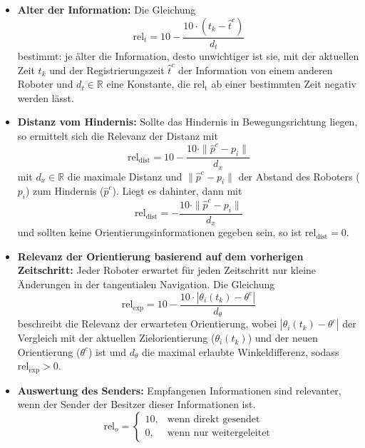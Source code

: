 \documentclass[conference]{IEEEtran}
\begin{document}
\begin{itemize}
    \item \textbf{Alter der Information:}
    Die Gleichung
    \begin{equation}
        \mathrm{rel}_t = 10 - \frac{10 \cdot (t_k - \hat{t}^c)}{d_t}
        \label{eq:5}
    \end{equation}
    bestimmt: je älter die Information, desto unwichtiger ist sie, mit 
    der aktuellen Zeit \( t_k \) und der Registrierungszeit \( \hat{t}^c \) der Information von einem 
    anderen Roboter und \( d_t \in \mathbb{R} \) eine Konstante, die \( \mathrm{rel_t} \) ab einer
    bestimmten Zeit negativ werden lässt.
    
    \item \textbf{Distanz vom Hindernis:}
    Sollte das Hindernis in Bewegungsrichtung liegen, 
    so ermittelt sich die Relevanz der Distanz mit 
    \begin{equation}
        \mathrm{rel}_{\mathrm{dist}} = 10 - \frac{10 \cdot \| \hat{p}^c - p_i \|}{d_x}
        \label{eq:6}
    \end{equation}
    mit \( d_x \in \mathbb{R} \) die maximale Distanz und \( \| \hat{p}^c - p_i \| \) der Abstand des Roboters ($p_i$) 
    zum Hindernis ($\hat{p}^c$). Liegt es dahinter, dann mit
    \begin{equation}
        \mathrm{rel}_{\mathrm{dist}} = - \frac{10 \cdot \| \hat{p}^c - p_i \|}{d_x}
        \label{eq:7}
    \end{equation}
    und sollten keine Orientierungsinformationen gegeben sein, so 
    ist \( \mathrm{rel}_{\mathrm{dist}} = 0 \).
    
    \item \textbf{Relevanz der Orientierung basierend auf dem vorherigen Zeitschritt:}
    Jeder Roboter erwartet für jeden Zeitschritt nur kleine Änderungen in der tangentialen 
    Navigation. Die Gleichung 
    \begin{equation}
        \mathrm{rel}_{\mathrm{exp}} = 10 - \frac{10 \cdot | \theta_i(t_k) - \theta^c |}{d_\theta}
        \label{eq:8}
    \end{equation}
    beschreibt die Relevanz der erwarteten Orientierung, wobei 
    \( |\theta_i(t_k) - \theta^c| \) der Vergleich mit der aktuellen Zielorientierung ($\theta_i(t_k)$) und 
    der neuen Orientierung ($\theta^c$) ist und \( d_\theta \) die maximal erlaubte Winkeldifferenz, sodass
    \( \mathrm{rel}_{\mathrm{exp}} > 0 \).
    
    \item \textbf{Auswertung des Senders:}
    Empfangenen Informationen sind relevanter, wenn der Sender der Besitzer dieser Informationen ist.
    \begin{equation}
        \mathrm{rel}_o =
        \begin{cases}
        10, & \text{wenn direkt gesendet}\\
        0, & \text{wenn nur weitergeleitet}
        \end{cases}
        \label{eq:9}
    \end{equation}
    

\end{itemize}
\end{document}

